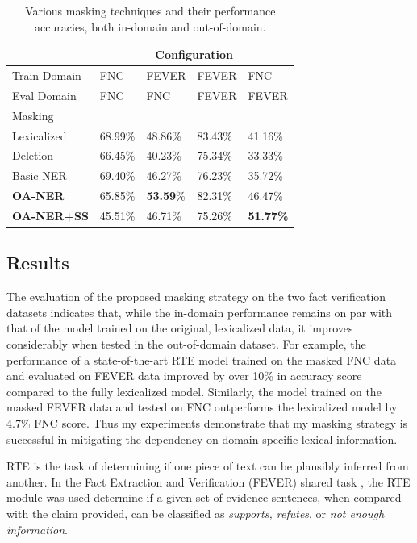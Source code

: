 \documentclass[compsoc,onecolumn]{IEEEtran}
\begin{document}
\begin{table}[ht]
\begin{center}
\begin{tabular}{p{22mm}|p{9mm}p{9mm}p{9mm}p{9mm}}
 & \multicolumn{4}{c}{Configuration} \\
 \hline
Train Domain & {FNC}& {FEVER}  & {FEVER} & {{FNC}} \\ 
Eval Domain & {FNC}& {{FNC}}  & {FEVER} & {{FEVER}} \\ \hline
Masking & & & & \\
\hline
Lexicalized &68.99\%& {48.86\%} &83.43\%& {41.16\%} \\
Deletion  &66.45\%& 40.23\% &75.34\%& 33.33\% \\
Basic NER &69.40\%& 46.27\% &76.23\%& 35.72\%\\
\textbf{OA-NER} &65.85\%& \textbf{53.59}\% &{82.31\%}& {46.47\%}\\
\textbf{OA-NER+SS} & 45.51\%& 46.71\% &75.26\%& {\bf 51.77\%}\\
\end{tabular}
\end{center}
    \caption{\label{crossdomain} Various masking techniques and their performance accuracies, both in-domain and out-of-domain.} \label{tab:results}

\end{table}


\subsection{Results} 
\label{sec:results}
The evaluation of the proposed masking strategy on the two fact verification datasets indicates that,
while the in-domain performance remains on par with that of the model trained on the original, lexicalized data, it improves considerably when tested in the out-of-domain dataset. 
For example, the performance of a state-of-the-art RTE model trained on the masked FNC data and evaluated on FEVER data improved by over 10\% in accuracy score compared to the fully lexicalized model. Similarly, the model trained on the masked FEVER data and tested on FNC outperforms the lexicalized model by 4.7\% FNC score.
Thus my experiments demonstrate that my masking strategy is successful in mitigating the dependency on domain-specific lexical information.

RTE is the task of determining if one piece of text can be plausibly inferred from another. In the Fact Extraction and Verification (FEVER) shared task \citep*{thorne2018fever}, the RTE module was used determine if a given set of evidence sentences, when compared with the claim provided, can be classified as \textit{supports, refutes}, or \textit{not enough information}.
\end{document}
